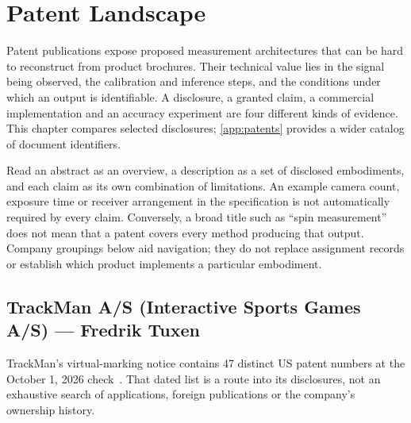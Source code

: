 \chapter{Patent Landscape}
\label{ch:patents}

Patent publications expose proposed measurement architectures that can be hard to reconstruct from product brochures.
Their technical value lies in the signal being observed, the calibration and inference steps, and the conditions under which an output is identifiable.
A disclosure, a granted claim, a commercial implementation and an accuracy experiment are four different kinds of evidence.
This chapter compares selected disclosures; \cref{app:patents} provides a wider catalog of document identifiers.

Read an abstract as an overview, a description as a set of disclosed embodiments, and each claim as its own combination of limitations.
An example camera count, exposure time or receiver arrangement in the specification is not automatically required by every claim.
Conversely, a broad title such as ``spin measurement'' does not mean that a patent covers every method producing that output.
Company groupings below aid navigation; they do not replace assignment records or establish which product implements a particular embodiment.

\section{TrackMan A/S (Interactive Sports Games A/S) --- Fredrik Tuxen}
\label{sec:patenttrackman}

TrackMan's virtual-marking notice contains 47 distinct US patent numbers at the October 1, 2026 check~\cite{trackmanpatents}.
That dated list is a route into its disclosures, not an exhaustive search of applications, foreign publications or the company's ownership history.

